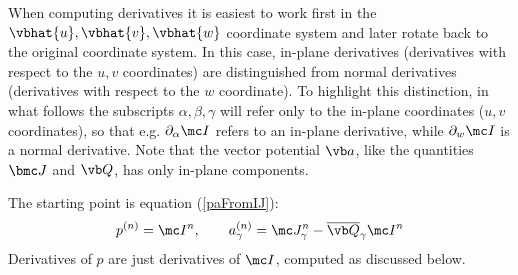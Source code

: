 \documentclass[letterpaper]{article}
\begin{document}
When computing derivatives it is easiest to work first
in the $\vbhat{u},\vbhat{v},\vbhat{w}$ coordinate system 
and later rotate back to the original coordinate system.
In this case, in-plane derivatives (derivatives with respect
to the $u,v$ coordinates) are distinguished from 
normal derivatives (derivatives with respect to the $w$ 
coordinate).
To highlight this distinction, in what follows the subscripts 
$\alpha,\beta,\gamma$ will refer only to the in-plane coordinates
($u,v$ coordinates), so that e.g. $\partial_\alpha \mc I$ refers 
to an in-plane derivative, while $\partial_w \mc I$ is a 
normal derivative. Note that the vector potential $\vb a$, 
like the quantities $\bmc J$ and $\vb Q$, has only
in-plane components.

The starting point is equation (\ref{paFromIJ}):
$$ p^{(n)} = \mc I^n, 
   \qquad 
   a_\gamma^{(n)} = \mc J^n_\gamma - \overline{\vb Q}_\gamma \mc I^n
$$
Derivatives of $p$ are just derivatives of $\mc I$,
computed as discussed below.
\end{document}
